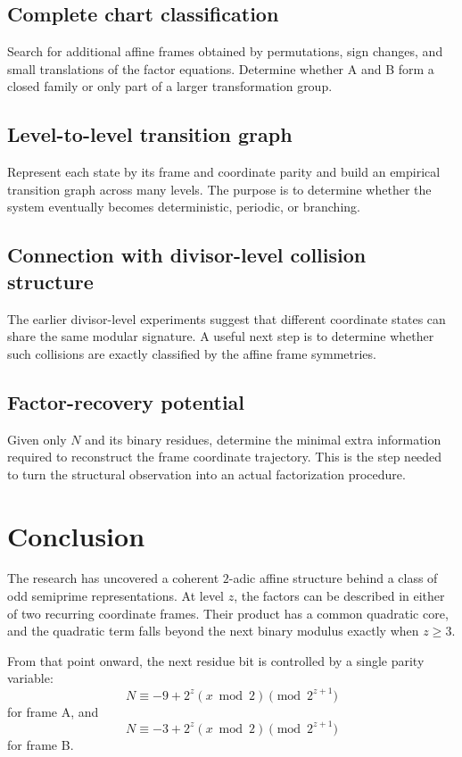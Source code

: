 \documentclass[11pt,a4paper]{article}
\theoremstyle{definition}
\theoremstyle{remark}
\begin{document}
\subsection{Complete chart classification}
Search for additional affine frames obtained by permutations, sign changes, and small translations of the factor equations. Determine whether A and B form a closed family or only part of a larger transformation group.

\subsection{Level-to-level transition graph}
Represent each state by its frame and coordinate parity and build an empirical transition graph across many levels. The purpose is to determine whether the system eventually becomes deterministic, periodic, or branching.

\subsection{Connection with divisor-level collision structure}
The earlier divisor-level experiments suggest that different coordinate states can share the same modular signature. A useful next step is to determine whether such collisions are exactly classified by the affine frame symmetries.

\subsection{Factor-recovery potential}
Given only $N$ and its binary residues, determine the minimal extra information required to reconstruct the frame coordinate trajectory. This is the step needed to turn the structural observation into an actual factorization procedure.

\section{Conclusion}

The research has uncovered a coherent $2$-adic affine structure behind a class of odd semiprime representations. At level $z$, the factors can be described in either of two recurring coordinate frames. Their product has a common quadratic core, and the quadratic term falls beyond the next binary modulus exactly when $z\ge3$.

From that point onward, the next residue bit is controlled by a single parity variable:
\[
\boxed{
N\equiv -9+2^z(x\bmod2)\pmod{2^{z+1}}
}
\]
for frame A, and
\[
\boxed{
N\equiv -3+2^z(x\bmod2)\pmod{2^{z+1}}
}
\]
for frame B.
\end{document}
